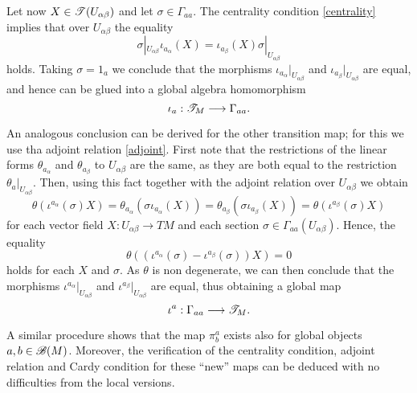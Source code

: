 Let now $X\in \mathscr{T}(U_{\alpha \beta })$ and let $\sigma \in
\Gamma_{aa}$. The centrality condition \eqref{centrality} implies that
over $U_{\alpha \beta }$ the equality
$$\sigma |_{U_{\alpha \beta}} \iota_{a_\alpha} (X) = \iota_{a_\beta} (X)\sigma |_{U_{\alpha \beta }}$$
holds. Taking $\sigma =1_a$ we conclude that the morphisms
$\iota_{a_\alpha }|_{U_{\alpha \beta }}$ and $\iota_{a_\beta
}|_{U_{\alpha \beta }}$ are equal, and hence can be glued into a
global algebra homomorphism
$$\iota_a:\mathscr{T}_M\longrightarrow \Gamma_{aa}.$$

An analogous conclusion can be derived for the other transition map;
for this we use tha adjoint relation \eqref{adjoint}. First note that
the restrictions of the linear forms $\theta_{a_\alpha}$ and
$\theta_{a_\beta }$ to $U_{\alpha \beta}$ are the same, as they are
both equal to the restriction $\theta_a|_{U_{\alpha \beta}}$. Then,
using this fact together with the adjoint relation over $U_{\alpha
  \beta }$ we obtain
$$\theta (\iota^{a_\alpha }(\sigma )X)=\theta_{a_\alpha}(\sigma \iota_{a_\alpha}(X))=\theta_{a_\beta}(\sigma \iota_{a_\beta}(X))=\theta (\iota^{a_\beta }(\sigma )X)$$
for each vector field $X:U_{\alpha \beta }\to TM$ and each section
$\sigma \in \Gamma_{aa}(U_{\alpha \beta})$. Hence, the equality
$$\theta \left ((\iota^{a_\alpha }(\sigma )-\iota^{a_\beta}(\sigma ))X\right )=0$$
holds for each $X$ and $\sigma$. As $\theta$ is non degenerate, we can
then conclude that the morphisms $\iota^{a_\alpha }|_{U_{\alpha \beta
  }}$ and $\iota^{a_\beta }|_{U_{\alpha \beta }}$ are equal, thus
obtaining a global map
$$\iota^a:\Gamma_{aa}\longrightarrow \mathscr{T}_M.$$

A similar procedure shows that the map $\pi^a_b$ exists also for
global objects $a,b\in \mathscr{B}(M)$. Moreover, the verification of the
centrality condition, adjoint relation and Cardy condition for these
``new'' maps can be deduced with no difficulties from the local
versions.


\clearpage

